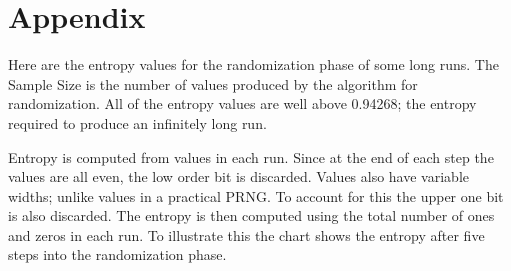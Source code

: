 \documentclass[letterpaper]{article}
\begin{document}
\appendix

\section*{Appendix}

Here are the entropy values for the randomization phase of some long runs. The Sample Size is the number of values produced by the algorithm for randomization. All of the entropy values are well above 0.94268; the entropy required to produce an infinitely long run.

Entropy is computed from values in each run. Since at the end of each step the values are all even, the low order bit is discarded. Values also have variable widths; unlike values in a practical PRNG. To account for this the upper one bit is also discarded. The entropy is then computed using the total number of ones and zeros in each run. To illustrate this the chart shows the entropy after five steps into the randomization phase. 
\end{document}
